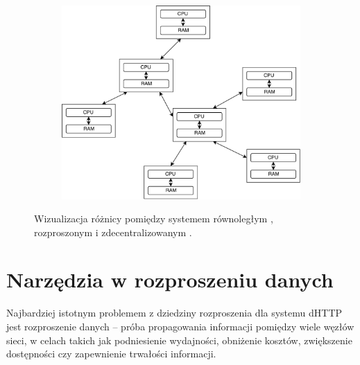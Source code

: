 \begin{figure}[h]
\begin{subfigure}{0.5\textwidth}
	\end{subfigure}
	\begin{subfigure}{0.6\textwidth}
		\centering
		\includegraphics[scale=0.5]{decentralized.pdf}
		\subcaption{\label{subfigure_c}}
	\end{subfigure}
	
	\caption{\label{fig:concurrentVsParalell}Wizualizacja różnicy pomiędzy systemem równoległym \protect{}, rozproszonym \protect{} i zdecentralizowanym \protect{}.}

\end{figure}

\section{Narzędzia w rozproszeniu danych}
\label{sec:narzedzia}
Najbardziej istotnym problemem z dziedziny rozproszenia dla systemu dHTTP jest rozproszenie danych -- próba propagowania informacji pomiędzy wiele węzłów sieci, w celach takich jak podniesienie wydajności, obniżenie kosztów, zwiększenie dostępności czy zapewnienie trwałości informacji.

